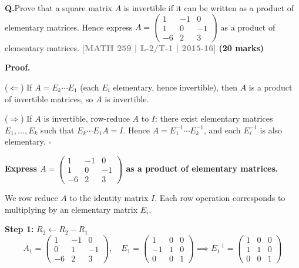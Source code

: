 \documentclass[12pt,a3paper]{article}
\newcommand{\yr}[1]{\hfill\textcolor{gray}{\small\textbf{[#1]}}}
\newcommand{\mk}[1]{\textcolor{orange!70!black}{\small\textbf{(#1 marks)}}}
\newcounter{qnum}
\newcommand{\Q}[1]{%
  \needspace{4\baselineskip}
  \refstepcounter{qnum}
  \vspace{6pt}
  \noindent\textbf{Q\theqnum.}\enspace #1\par
}
\begin{document}
\Q{Prove that a square matrix $A$ is invertible if it can be written as a product of elementary matrices. Hence express $A = \begin{pmatrix} 1 & -1 & 0 \\ 1 & 0 & -1 \\ -6 & 2 & 3 \end{pmatrix}$ as a product of elementary matrices.
\yr{MATH 259 | L-2/T-1 | 2015-16} \mk{20}}
\begin{tcolorbox}[enhanced,breakable,
  colback=cB!4,colframe=cB,boxrule=0.8pt,arc=5pt,
  title={\textbf{Answer --- Invertible $\Leftrightarrow$ Product of Elementary Matrices}},
  fonttitle=\bfseries\color{white},colbacktitle=cB]

\textbf{Proof.}

($\Leftarrow$) If $A = E_k\cdots E_1$ (each $E_i$ elementary, hence invertible), then $A$ is a product of invertible matrices, so $A$ is invertible.

($\Rightarrow$) If $A$ is invertible, row-reduce $A$ to $I$: there exist elementary matrices $E_1,\ldots,E_k$ such that $E_k\cdots E_1 A = I$. Hence $A = E_1^{-1}\cdots E_k^{-1}$, and each $E_i^{-1}$ is also elementary. \hfill$\square$

\medskip
\textbf{Express $A=\begin{pmatrix}1&-1&0\\1&0&-1\\-6&2&3\end{pmatrix}$ as a product of elementary matrices.}

We row reduce $A$ to the identity matrix $I$. Each row operation corresponds to multiplying by an elementary matrix $E_i$.

\textbf{Step 1:} $R_2 \leftarrow R_2 - R_1$
\[
A_1 = \begin{pmatrix}1&-1&0\\0&1&-1\\-6&2&3\end{pmatrix}, \quad
E_1 = \begin{pmatrix}1&0&0\\-1&1&0\\0&0&1\end{pmatrix} \implies E_1^{-1} = \begin{pmatrix}1&0&0\\1&1&0\\0&0&1\end{pmatrix}
\]


\end{tcolorbox}
\end{document}
